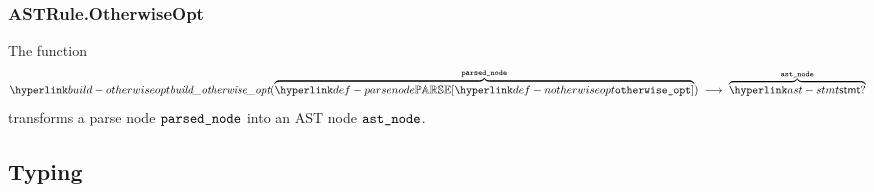 \begin{mathpar}
\end{mathpar}

\begin{mathpar}
\end{mathpar}

\subsubsection{ASTRule.OtherwiseOpt\label{sec:ASTRule.OtherwiseOpt}}
\hypertarget{build-otherwiseopt}{}
The function
\[
\buildotherwiseopt(\overname{\parsenode{\Notherwiseopt}}{\vparsednode}) \;\aslto\; \overname{\stmt?}{\vastnode}
\]
transforms a parse node $\vparsednode$ into an AST node $\vastnode$.

\begin{mathpar}
\end{mathpar}

\subsection{Typing}
